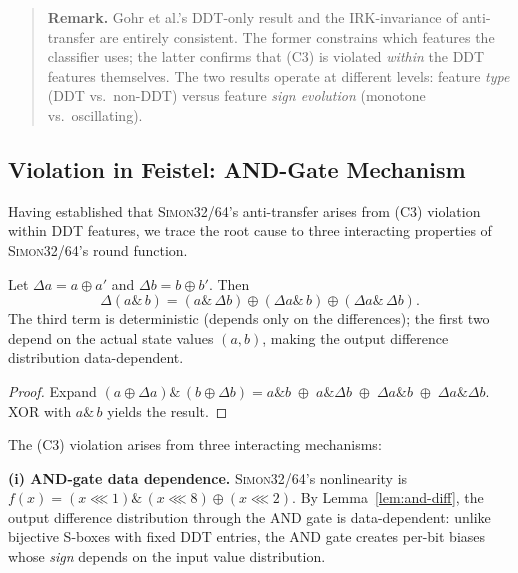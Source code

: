 \documentclass[runningheads]{llncs}
\newcommand{\simon}{\textsc{Simon32/64}}
\begin{document}
\begin{quote}\small
\textbf{Remark.}
Gohr et al.'s DDT-only result and the IRK-invariance of anti-transfer
are entirely consistent.
The former constrains which features the classifier uses;
the latter confirms that (C3) is violated \emph{within} the DDT features
themselves.
The two results operate at different levels: feature
\emph{type} (DDT vs.\ non-DDT) versus feature
\emph{sign evolution} (monotone vs.\ oscillating).
\end{quote}

\subsection{Violation in Feistel: AND-Gate Mechanism}
\label{sec:simon-why}

Having established that \simon's anti-transfer arises from (C3) violation within DDT features, we trace the root cause to three interacting properties of \simon's round function.

\begin{lemma}
\label{lem:and-diff}
Let $\Delta a = a \oplus a'$ and $\Delta b = b \oplus b'$. Then
\begin{equation}\label{eq:and-diff}
  \Delta(a \mathbin{\&}\, b) = (a \mathbin{\&}\, \Delta b)
  \oplus (\Delta a \mathbin{\&}\, b)
  \oplus (\Delta a \mathbin{\&}\, \Delta b).
\end{equation}
The third term is deterministic (depends only on the differences);
the first two depend on the actual state values $(a,b)$,
making the output difference distribution data-dependent.
\end{lemma}

\begin{proof}
Expand $(a \oplus \Delta a) \mathbin{\&}\, (b \oplus \Delta b)
= a{\mathbin{\&}}b \;\oplus\; a{\mathbin{\&}}\Delta b
\;\oplus\; \Delta a{\mathbin{\&}}b
\;\oplus\; \Delta a{\mathbin{\&}}\Delta b$.
XOR with $a \mathbin{\&}\, b$ yields the result.
\end{proof}

The (C3) violation arises from three interacting mechanisms:

\textbf{(i) AND-gate data dependence.}
\simon's nonlinearity is $f(x) = (x \lll 1) \mathbin{\&}\, (x \lll 8) \oplus (x \lll 2)$.
By Lemma~\ref{lem:and-diff}, the output difference distribution through the AND gate is data-dependent: unlike bijective S-boxes with fixed DDT entries, the AND gate creates per-bit biases whose \emph{sign} depends on the input value distribution.
\end{document}
